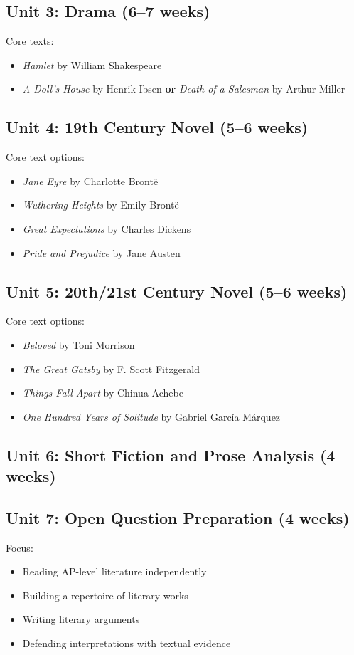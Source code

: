 \documentclass[12pt,oneside]{book}
\begin{document}
\subsection*{Unit 3: Drama (6--7 weeks)}
Core texts:
\begin{itemize}[leftmargin=2em]
    \item \emph{Hamlet} by William Shakespeare
    \item \emph{A Doll's House} by Henrik Ibsen \textbf{or} \emph{Death of a Salesman} by Arthur Miller
\end{itemize}

\subsection*{Unit 4: 19th Century Novel (5--6 weeks)}
Core text options:
\begin{itemize}[leftmargin=2em]
    \item \emph{Jane Eyre} by Charlotte Brontë
    \item \emph{Wuthering Heights} by Emily Brontë
    \item \emph{Great Expectations} by Charles Dickens
    \item \emph{Pride and Prejudice} by Jane Austen
\end{itemize}

\subsection*{Unit 5: 20th/21st Century Novel (5--6 weeks)}
Core text options:
\begin{itemize}[leftmargin=2em]
    \item \emph{Beloved} by Toni Morrison
    \item \emph{The Great Gatsby} by F. Scott Fitzgerald
    \item \emph{Things Fall Apart} by Chinua Achebe
    \item \emph{One Hundred Years of Solitude} by Gabriel García Márquez
\end{itemize}

\subsection*{Unit 6: Short Fiction and Prose Analysis (4 weeks)}

\subsection*{Unit 7: Open Question Preparation (4 weeks)}
Focus:
\begin{itemize}[leftmargin=2em]
    \item Reading AP-level literature independently
    \item Building a repertoire of literary works
    \item Writing literary arguments
    \item Defending interpretations with textual evidence
\end{itemize}
\end{document}
